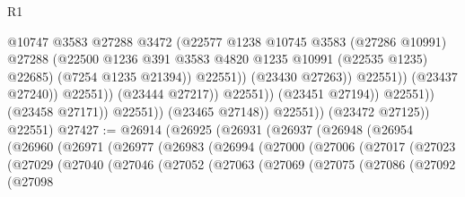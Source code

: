 \begin{lexlean}{R1}
\begin{coremodule}
                                                @10747
                                                @3583
                                                @27288
                                                @3472
                                                (@22577
                                                  @1238
                                                  @10745
                                                  @3583
                                                  (@27286 @10991)
                                                  @27288
                                                  (@22500
                                                    @1236
                                                    @391
                                                    @3583
                                                    @4820
                                                    @1235
                                                    @10991
                                                    (@22535 @1235)
                                                    @22685)
                                                  (@7254 @1235 @21394))
                                                @22551))
                                            (@23430 @27263))
                                          @22551))
                                      (@23437 @27240))
                                    @22551))
                                (@23444 @27217))
                              @22551))
                          (@23451 @27194))
                        @22551))
                    (@23458 @27171))
                  @22551))
              (@23465 @27148))
            @22551))
        (@23472 @27125))
      @22551)
@27427 := @26914
    (@26925
      (@26931
        (@26937
          (@26948
            (@26954
              (@26960
                (@26971
                  (@26977
                    (@26983
                      (@26994
                        (@27000
                          (@27006
                            (@27017
                              (@27023
                                (@27029
                                  (@27040
                                    (@27046
                                      (@27052
                                        (@27063
                                          (@27069
                                            (@27075
                                              (@27086
                                                (@27092
                                                  (@27098

\end{coremodule}
\end{lexlean}
